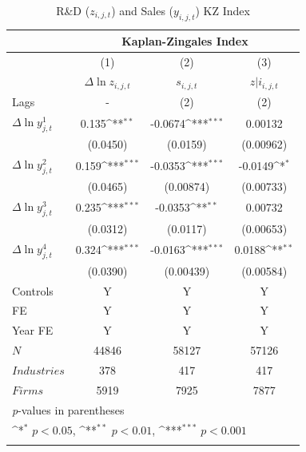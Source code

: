 \documentclass{_latex/house}
\begin{document}
\begin{table}[h]\footnotesize
\caption{R\&D ($z_{i,j,t}$) and Sales ($y_{i,j,t}$) KZ Index}
\begin{center}
{
\def\sym#1{\ifmmode^{#1}\else\(^{#1}\)\fi}
\begin{tabular}{l*{3}{c}}
          &\multicolumn{3}{c}{Kaplan-Zingales Index} \\
\hline\hline
            &\multicolumn{1}{c}{(1)}&\multicolumn{1}{c}{(2)}&\multicolumn{1}{c}{(3)}\\
            &\multicolumn{1}{c}{$\Delta \ln{z_{i,j,t}}$}&\multicolumn{1}{c}{$s_{i,j,t}$}&\multicolumn{1}{c}{$z|i_{i,j,t}$}\\
\hline
Lags & - & (2) & (2) \\
$\Delta\ln{y_{j,t}^{1}}$ &       0.135\sym{**} &     -0.0674\sym{***}&     0.00132         \\
            &    (0.0450)         &    (0.0159)         &   (0.00962)         \\
[1em]
$\Delta\ln{y_{j,t}^{2}}$  &       0.159\sym{***}&     -0.0353\sym{***}&     -0.0149\sym{*}  \\
            &    (0.0465)         &   (0.00874)         &   (0.00733)         \\
[1em]
$\Delta\ln{y_{j,t}^{3}}$  &       0.235\sym{***}&     -0.0353\sym{**} &     0.00732         \\
            &    (0.0312)         &    (0.0117)         &   (0.00653)         \\
[1em]
$\Delta\ln{y_{j,t}^{4}}$  &       0.324\sym{***}&     -0.0163\sym{***}&      0.0188\sym{**} \\
            &    (0.0390)         &   (0.00439)         &   (0.00584)         \\

Controls & Y & Y & Y \\
FE & Y & Y & Y \\
Year FE & Y & Y & Y \\
\hline
\(N\)       &       44846         &       58127         &       57126         \\
\(Industries\)      &       378         &       417         &       417             \\
\(Firms\)      &       5919         &       7925          &       7877        \\
\hline\hline
\multicolumn{4}{l}{\footnotesize \textit{p}-values in parentheses}\\
\multicolumn{4}{l}{\footnotesize \sym{*} \(p<0.05\), \sym{**} \(p<0.01\), \sym{***} \(p<0.001\)}\\
\label{tab:table15}
\end{tabular}
}
\end{center}
\end{table}
\end{document}
